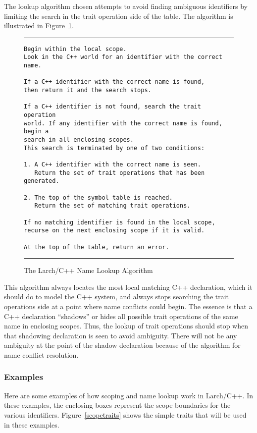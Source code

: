 \documentclass[12pt]{article} %
\newcommand{\UNSPACEFORBOX}{\vspace{-2ex}}
\newcommand{\HLINE}{\UNSPACEFORBOX%
\begin{flushleft}\rule{\textwidth}{0.01in}\end{flushleft}%
\UNSPACEFORBOX}
\newenvironment{BFIGURE}{

\begin{figure}
\small
\HLINE
}{
\HLINE
\normalsize
\end{figure}
}
\begin{document}
The lookup algorithm chosen attempts to avoid finding ambiguous
identifiers by limiting the search in the trait operation side of the
table. The algorithm is illustrated in Figure~\ref{lookupalgm}.
\begin{BFIGURE}
\begin{verbatim}
Begin within the local scope.  
Look in the C++ world for an identifier with the correct name.

If a C++ identifier with the correct name is found, 
then return it and the search stops.

If a C++ identifier is not found, search the trait operation
world. If any identifier with the correct name is found, begin a
search in all enclosing scopes. 
This search is terminated by one of two conditions:

1. A C++ identifier with the correct name is seen. 
   Return the set of trait operations that has been generated.

2. The top of the symbol table is reached.
   Return the set of matching trait operations.

If no matching identifier is found in the local scope,
recurse on the next enclosing scope if it is valid. 

At the top of the table, return an error.

\end{verbatim}
\caption{The Larch/C++ Name Lookup Algorithm}
\label{lookupalgm}
\end{BFIGURE}

This algorithm always locates the most local matching C++ declaration,
which it should do to model the C++ system, and always stops searching
the trait operations side at a point where name conflicts could
begin. The essence is that a C++ declaration ``shadows'' or hides all
possible trait operations of the same name in enclosing scopes. Thus,
the lookup of trait operations should stop when that shadowing
declaration is seen to avoid ambiguity. There will not
be any ambiguity at the point of the shadow declaration because of the
algorithm for name conflict resolution.

\subsubsection{Examples}
Here are some examples of how scoping and name lookup work in
Larch/C++. In these examples, the enclosing boxes represent the scope
boundaries for the various identifiers. Figure~\ref{scopetraits} shows
the simple traits that will be used in these examples.
\end{document}
